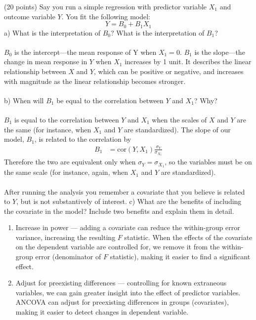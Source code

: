 \documentclass[onecolumn,10pt]{jhwhw}
\begin{document}
\problem{}%
(20 points) Say you run a simple regression with predictor variable $X_1$ and outcome variable $Y$. You fit the following model:
                $$Y = B_0 + B_1 X_1$$
a) What is the interpretation of $B_0$? What is the interpretation of $B_1$?\\
\\
$B_0$ is the intercept---the mean response of Y when $X_1 = 0$. $B_1$ is the slope---the change in mean response in $Y$ when $X_1$ increases by 1 unit. It describes the linear relationship between $X$ and $Y$, which can be positive or negative, and increases with magnitude as the linear relationship becomes stronger.\\
\\
b) When will $B_1$ be equal to the correlation between $Y$ and $X_1$? Why?\\
\\
$B_1$ is equal to the correlation between $Y$ and $X_1$ when the scales of $X$ and $Y$ are the same (for instance, when $X_1$ and $Y$ are standardized).
The slope of our model, $B_1$, is related to the correlation by
\begin{align*}
B_1 &= \mbox{cor}(Y, X_1) \frac{\sigma_Y}{\sigma_{X_1}}
\end{align*}
Therefore the two are equivalent only when $\sigma_{Y} = \sigma_{X_1}$, so the variables must be on the same scale (for instance, again, when $X_1$ and $Y$ are standardized).\\
\\
After running the analysis you remember a covariate that you believe is related to $Y$, but is not substantively of interest.
c) What are the benefits of including the covariate in the model? Include two benefits and explain them in detail.
\begin{enumerate}
\item Increase in power --- adding a covariate can reduce the within-group error variance, increasing the resulting $F$ statistic. When the effects of the covariate on the dependent variable are controlled for, we remove it from the within-group error (denominator of $F$ statistic), making it easier to find a significant effect.
\item Adjust for preexisting differences --- controlling for known extraneous variables, we can gain greater insight into the effect of predictor variables. ANCOVA can adjust for preexisting differences in groups (covariates), making it easier to detect changes in dependent variable.
\end{enumerate}
\end{document}
